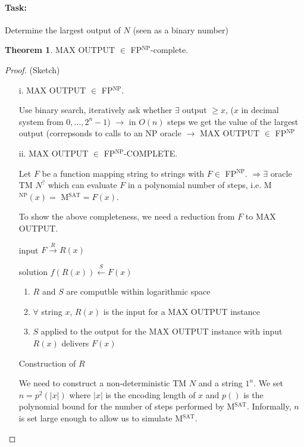 \documentclass[11pt]{article}
\theoremstyle{definition}
\newtheorem{theorem}{Theorem}[section]
\theoremstyle{definition}
\begin{document}
\paragraph{Task:} Determine the largest output of $ N $ (seen as a binary number)

\begin{theorem}
MAX OUTPUT $ \in $ FP$^{\text{NP}}$-complete.
\end{theorem}

\begin{proof} (Sketch)

\begin{enumerate}
\item[i.]
	MAX OUTPUT  $ \in $ FP$^{\text{NP}}$.

	Use binary search, iteratively ask whether $ \exists $ output $ \geq x $, ($ x $ in decimal system from $ 0, \dots, 2^{n} - 1 $) $ \rightarrow $ in $ O(n) $ steps we get the value of the largest output (correpsonds to calls to an NP oracle $ \rightarrow $ MAX OUTPUT $ \in $ FP$^{\text{NP}}$
\item[ii.]
	MAX OUTPUT $ \in $ FP$^{\text{NP}}$-COMPLETE.
	
	Let $ F $ be a function mapping string to strings with $ F \in $ FP$^{\text{NP}}$. $ \Rightarrow \exists $ oracle TM $ N^? $ which can evaluate $ F $ in a polynomial number of steps, i.e. M$^{\text{NP}}(x) = $ M$^{\text{SAT}} = F(x)$.
	
	To show the above completeness, we need a reduction from $ F $ to MAX OUTPUT.
	
	input $ F \overset{R}{\longrightarrow} R(x) $
	
	solution $ f(R(x)) \overset{S}{\longleftarrow} F(x) $
	
	\begin{enumerate}
	\item $ R $ and $ S $ are computble within logarithmic space
	\item $ \forall $ string $ x $, $ R(x) $ is the input for a MAX OUTPUT  instance
	\item $ S $ applied to the output for the MAX OUTPUT  instance with input $ R(x) $ delivers $ F(x)$
	\end{enumerate}
	
	Construction of $ R $
	
	We need to construct a non-deterministic TM $ N $ and a string $ 1^n $. We set $ n = p^2(|x|) $ where $ |x| $ is the encoding length of $ x $ and $ p() $ is the polynomial bound for the number of steps performed by M$^{\text{SAT}}$. Informally, $ n $ is set large enough to allow us to simulate M$^{\text{SAT}}$.
	

\end{enumerate}
\end{proof}
\end{document}
